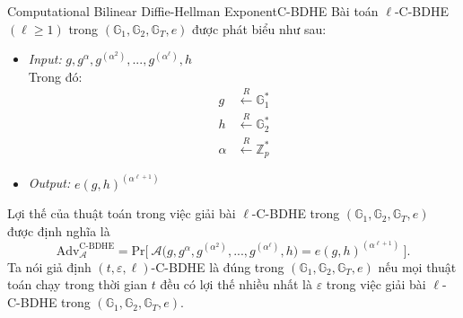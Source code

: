 \documentclass[class=report, crop=false]{standalone}
\begin{document}
		\begin{problem}{Computational Bilinear Diffie-Hellman Exponent}{C-BDHE}
			Bài toán $\ell$-C-BDHE $(\ell \geq 1)$ trong $(\mathbb{G}_1, \mathbb{G}_2, \mathbb{G}_T, e)$ được phát biểu như sau:
			\vspace{-\baselineskip}
			\begin{itemize}[leftmargin=1.5cm, itemindent=-0.5cm]
				\item[] \textit{Input:} $g, g^\alpha, g^{(\alpha^2)}, ..., g^{(\alpha^\ell)}, h$ \\
				Trong đó: \vspace{-\baselineskip}
				\begin{align*}
					g 		&\xleftarrow{R} \mathbb{G}_1^* \\
					h 		&\xleftarrow{R} \mathbb{G}_2^* \\
					\alpha 	&\xleftarrow{R} \mathbb{Z}_p^*
				\end{align*}
				\item[] \textit{Output:} $e(g, h)^{(\alpha^{\ell + 1})}$
			\end{itemize}
			\vspace{-\baselineskip}\par
			Lợi thế của thuật toán \algo trong việc giải bài $\ell$-C-BDHE trong $(\mathbb{G}_1, \mathbb{G}_2, \mathbb{G}_T, e)$ được định nghĩa là
			\[
				\text{Adv}_{\mathcal{A}}^{\text{C-BDHE}} = \text{Pr}\bigg[ \ \mathcal{A}\Big(g, g^\alpha, g^{(\alpha^2)}, ..., g^{(\alpha^\ell)}, h \Big) = e(g, h)^{(\alpha^{\ell + 1})} \ \bigg].
			\] \indent
			Ta nói giả định $(t, \varepsilon, \ell)$-C-BDHE là đúng trong $(\mathbb{G}_1, \mathbb{G}_2, \mathbb{G}_T, e)$ nếu mọi thuật toán chạy trong thời gian $t$ đều có lợi thế nhiều nhất là $\varepsilon$ trong việc giải bài $\ell$-C-BDHE trong $(\mathbb{G}_1, \mathbb{G}_2, \mathbb{G}_T, e)$.
		\end{problem}
		\newpage
\end{document}
